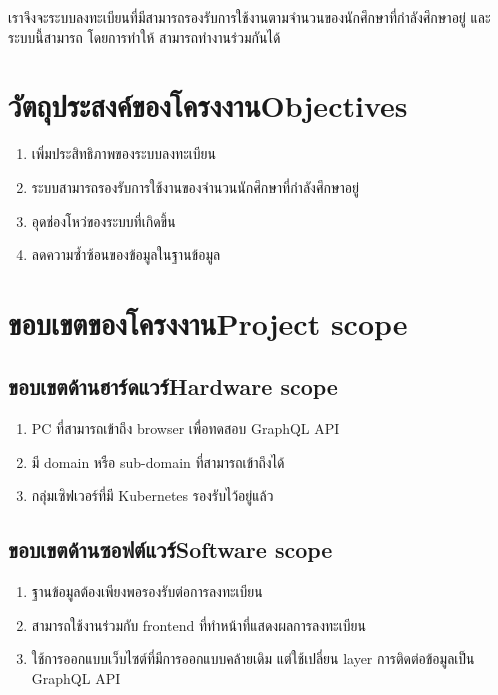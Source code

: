 เราจึงจะระบบลงทะเบียนที่มีสามารถรองรับการใช้งานตามจำนวนของนักศึกษาที่กำลังศึกษาอยู่ และ ระบบนี้สามารถ โดยการทำให้ สามารถทำงานร่วมกันได้

\section{\ifcpe วัตถุประสงค์ของโครงงาน\else Objectives\fi}
\begin{enumerate}
    \item เพิ่มประสิทธิภาพของระบบลงทะเบียน
    \item ระบบสามารถรองรับการใช้งานของจำนวนนักศึกษาที่กำลังศึกษาอยู่
    \item อุดช่องโหว่ของระบบที่เกิดขึ้น
    \item ลดความซ้ำซ้อนของข้อมูลในฐานข้อมูล
\end{enumerate}

\section{\ifcpe ขอบเขตของโครงงาน\else Project scope\fi}

\subsection{\ifcpe ขอบเขตด้านฮาร์ดแวร์\else Hardware scope\fi}
\begin{enumerate}
    \item PC ที่สามารถเข้าถึง browser เพื่อทดสอบ GraphQL API
    \item มี domain หรือ sub-domain ที่สามารถเข้าถึงได้
    \item กลุ่มเซิฟเวอร์ที่มี Kubernetes รองรับไว้อยู่แล้ว
\end{enumerate}
\subsection{\ifcpe ขอบเขตด้านซอฟต์แวร์\else Software scope\fi}
\begin{enumerate}
    \item ฐานข้อมูลต้องเพียงพอรองรับต่อการลงทะเบียน
    \item สามารถใช้งานร่วมกับ frontend ที่ทำหน้าที่แสดงผลการลงทะเบียน
    \item ใช้การออกแบบเว็บไซต์ที่มีการออกแบบคล้ายเดิม แต่ใช้เปลี่ยน layer การติดต่อข้อมูลเป็น GraphQL API \cite{graphql}
\end{enumerate}
